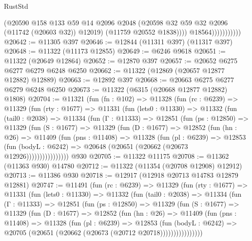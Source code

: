 \begin{lexlean}{RustStd}
\begin{coremodule}
                              (@20590
                                @158
                                @133
                                @59
                                @14
                                @2096
                                @2048
                                (@20598 @32 @59 @32 @2096 (@11742 (@20603 @32)) @12019)
                                (@11759 @20552 @1838))))
                          @18564)))))))))))
@20642 := @11305 @397
@20646 := @12844 (@11311 @397) (@11317 @397)
@20648 := @11322 (@11173 @12855)
@20649 := @6246 @9618
@20651 := @11322 (@20649 @12864)
@20652 := @12870 @397
@20657 := @20652 @6275 @6277 @6279 @6248 @6250
@20662 := @11322 (@12869 (@20657 @12877 @12882) @12889)
@20663 := @12892 @397
@20668 := @20663 @6275 @6277 @6279 @6248 @6250
@20673 := @11322 (@6315 (@20668 @12877 @12882) @1808)
@20704 := @11321
    (fun (fn : @102) =>
    @11328
      (fun (rc : @6239) =>
      @11329
        (fun (rty : @1677) =>
        @11331
          (fun (lets0 : @11330) =>
          @11332
            (fun (tail0 : @2038) =>
            @11334
              (fun (Γ : @11333) =>
              @12851
                (fun (ps : @12850) =>
                @11329
                  (fun (S : @1677) =>
                  @11329
                    (fun (D : @1677) =>
                    @12852
                      (fun (hn : @26) =>
                      @11409
                        (fun (pns : @11408) =>
                        @11328
                          (fun (pl : @6239) =>
                          @12853
                            (fun (bodyL : @6242) =>
                            @20648 (@20651 (@20662 (@20673 @12926))))))))))))))))
    @930
@20705 := @11322 @11175
@20708 := @11362 (@11363 @930) @14780
@20712 := @11322 (@11354 (@20708 @12908) @12912)
@20713 := @11386 @930
@20718 := @12917 (@12918 @20713 @14783 @12879 @12881)
@20747 := @11491
    (fun (rc : @6239) =>
    @11329
      (fun (rty : @1677) =>
      @11331
        (fun (lets0 : @11330) =>
        @11332
          (fun (tail0 : @2038) =>
          @11334
            (fun (Γ : @11333) =>
            @12851
              (fun (ps : @12850) =>
              @11329
                (fun (S : @1677) =>
                @11329
                  (fun (D : @1677) =>
                  @12852
                    (fun (hn : @26) =>
                    @11409
                      (fun (pns : @11408) =>
                      @11328
                        (fun (pl : @6239) =>
                        @12853
                          (fun (bodyL : @6242) =>
                          @20705 (@20651 (@20662 (@20673 (@20712 @20718))))))))))))))))

\end{coremodule}
\end{lexlean}

